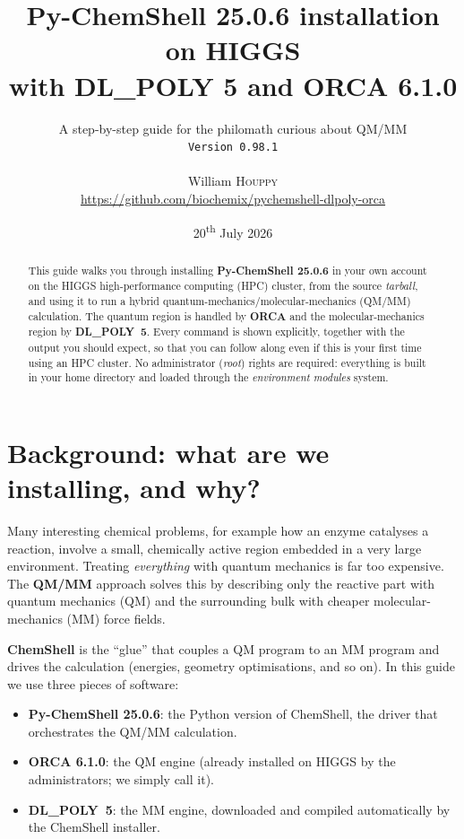 \documentclass[12pt,a4paper]{article}
\title{\textbf{Py-ChemShell 25.0.6 installation on HIGGS\\[2pt]
with DL\_POLY 5 and ORCA 6.1.0}}
\author{
\large A step-by-step guide for the philomath curious about QM/MM\\[4pt]
\normalsize\texttt{Version 0.98.1}\\[4pt]
\date{20\textsuperscript{th} July 2026}
William \textsc{Houppy}\\[4pt]
\normalsize\url{https://github.com/biochemix/pychemshell-dlpoly-orca}}
\begin{document}
\maketitle
\thispagestyle{fancy}

\begin{abstract}
\noindent
This guide walks you through installing \textbf{Py-ChemShell 25.0.6} in your own
account on the HIGGS high-performance computing (HPC) cluster, from the source
\emph{tarball}, and using it to run a hybrid quantum-mechanics/molecular-mechanics
(QM/MM) calculation. The quantum region is handled by \textbf{ORCA} and the
molecular-mechanics region by \textbf{DL\_POLY~5}. Every command is shown
explicitly, together with the output you should expect, so that you can follow
along even if this is your first time using an HPC cluster. No administrator
(\emph{root}) rights are required: everything is built in your home directory and
loaded through the \emph{environment modules} system.
\end{abstract}

\tableofcontents
\vspace{1em}

\setcounter{section}{-1}
\setcounter{figure}{-1}

\section{Background: what are we installing, and why?}
\setcounter{subsection}{-1}

Many interesting chemical problems, for example how an enzyme catalyses a
reaction, involve a small, chemically active region embedded in a very large
environment. Treating \emph{everything} with quantum mechanics is far too
expensive. The \textbf{QM/MM} approach solves this by describing only the reactive
part with quantum mechanics (QM) and the surrounding bulk with cheaper
molecular-mechanics (MM) force fields.

\textbf{ChemShell} is the ``glue'' that couples a QM program to an MM program and
drives the calculation (energies, geometry optimisations, and so on). In this
guide we use three pieces of software:

\begin{itemize}
  \item \textbf{Py-ChemShell 25.0.6}: the Python version of ChemShell, the
        driver that orchestrates the QM/MM calculation.
  \item \textbf{ORCA 6.1.0}: the QM engine (already installed on HIGGS by the
        administrators; we simply call it).
  \item \textbf{DL\_POLY~5}: the MM engine, downloaded and compiled
        automatically by the ChemShell installer.
\end{itemize}
\end{document}
